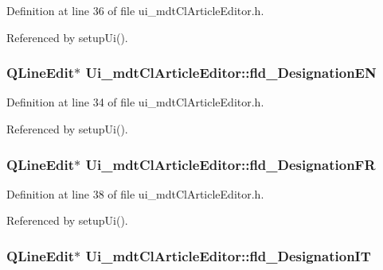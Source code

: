 Definition at line 36 of file ui\-\_\-mdt\-Cl\-Article\-Editor.\-h.



Referenced by setup\-Ui().

\hypertarget{class_ui__mdt_cl_article_editor_aa15ec8a5f140febdf7623bb206886875}{
\subsubsection[{fld\-\_\-\-Designation\-E\-N}]{\setlength{\rightskip}{0pt plus 5cm}Q\-Line\-Edit$\ast$ Ui\-\_\-mdt\-Cl\-Article\-Editor\-::fld\-\_\-\-Designation\-E\-N}}\label{class_ui__mdt_cl_article_editor_aa15ec8a5f140febdf7623bb206886875}


Definition at line 34 of file ui\-\_\-mdt\-Cl\-Article\-Editor.\-h.



Referenced by setup\-Ui().

\hypertarget{class_ui__mdt_cl_article_editor_ab058ffab8e6cac94de4c7fb25ae5af65}{
\subsubsection[{fld\-\_\-\-Designation\-F\-R}]{\setlength{\rightskip}{0pt plus 5cm}Q\-Line\-Edit$\ast$ Ui\-\_\-mdt\-Cl\-Article\-Editor\-::fld\-\_\-\-Designation\-F\-R}}\label{class_ui__mdt_cl_article_editor_ab058ffab8e6cac94de4c7fb25ae5af65}


Definition at line 38 of file ui\-\_\-mdt\-Cl\-Article\-Editor.\-h.



Referenced by setup\-Ui().

\hypertarget{class_ui__mdt_cl_article_editor_a8b17c4f4e406af6d499f98be60431802}{
\subsubsection[{fld\-\_\-\-Designation\-I\-T}]{\setlength{\rightskip}{0pt plus 5cm}Q\-Line\-Edit$\ast$ Ui\-\_\-mdt\-Cl\-Article\-Editor\-::fld\-\_\-\-Designation\-I\-T}}\label{class_ui__mdt_cl_article_editor_a8b17c4f4e406af6d499f98be60431802}


